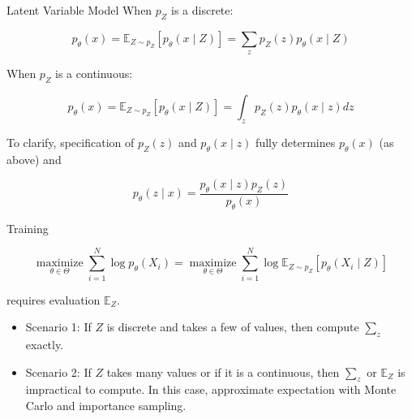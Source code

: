 \begin{frame}[allowframebreaks]
\begin{mydefinitionblock}{11.4}{Latent Variable Model}
    When $p_{Z}$ is a discrete:

    $$
    p_{\theta}(x)=\mathbb{E}_{Z \sim p_{Z}}\left[p_{\theta}(x \mid Z)\right]=\sum_{z} p_{Z}(z) p_{\theta}(x \mid Z)
    $$

    When $p_{Z}$ is a continuous:

    $$
    p_{\theta}(x)=\mathbb{E}_{Z \sim p_{Z}}\left[p_{\theta}(x \mid Z)\right]=\int_{z} p_{Z}(z) p_{\theta}(x \mid z) d z
    $$

    To clarify, specification of $p_{Z}(z)$ and $p_{\theta}(x \mid z)$ fully determines $p_{\theta}(x)$ (as above) and

    $$
    p_{\theta}(z \mid x)=\frac{p_{\theta}(x \mid z) p_{Z}(z)}{p_{\theta}(x)}
    $$

    \par\noindent\textcolor{gray}{\hdashrule{\textwidth}{0.4pt}{1pt 2pt}}

    Training

    $$
    \underset{\theta \in \Theta}{\operatorname{maximize}} \sum_{i=1}^{N} \log p_{\theta}\left(X_{i}\right)=\underset{\theta \in \Theta}{\operatorname{maximize}} \sum_{i=1}^{N} \log \mathbb{E}_{Z \sim p_{Z}}\left[p_{\theta}\left(X_{i} \mid Z\right)\right]
    $$

    requires evaluation $\mathbb{E}_{Z}$.

    \begin{itemize}
        \item Scenario 1: If $Z$ is discrete and takes a few of values, then compute $\sum_{z}$ exactly.
        \item Scenario 2: If $Z$ takes many values or if it is a continuous, then $\sum_{z}$ or $\mathbb{E}_{Z}$ is impractical to compute. In this case, approximate expectation with Monte Carlo and importance sampling.
    \end{itemize}
\end{mydefinitionblock}

\end{frame}

